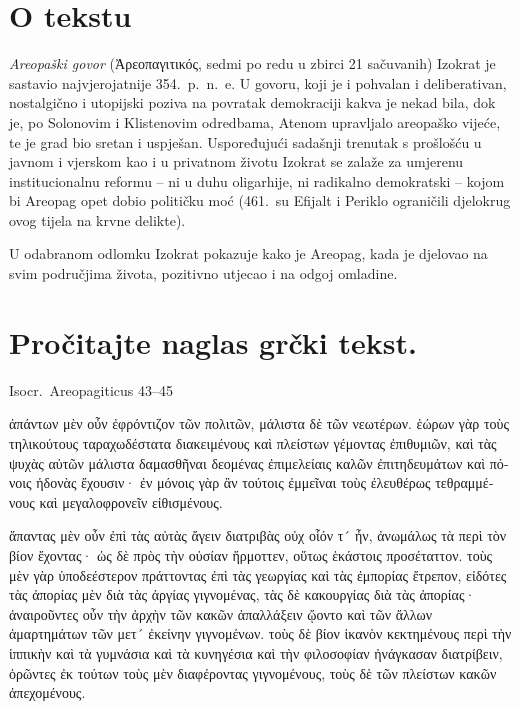 


\section*{O tekstu}

\textit{Areopaški govor} (Ἀρεοπαγιτικός, sedmi po redu u zbirci 21 sačuvanih) Izokrat je sastavio najvjerojatnije 354.\ p.~n.~e. U govoru, koji je i pohvalan i deliberativan, nostalgično i utopijski poziva na povratak demokraciji kakva je nekad bila, dok je, po Solonovim i Klistenovim odredbama, Atenom upravljalo areopaško vijeće, te je grad bio sretan i uspješan. Uspoređujući sadašnji trenutak s prošlošću u javnom i vjerskom kao i u privatnom životu Izokrat se zalaže za umjerenu institucionalnu reformu – ni u duhu oligarhije, ni radikalno demokratski – kojom bi Areopag opet dobio političku moć (461.\ su Efijalt i Periklo ograničili djelokrug ovog tijela na krvne delikte).

U odabranom odlomku Izokrat pokazuje kako je Areopag, kada je djelovao na svim područjima života, pozitivno utjecao i na odgoj omladine.


\section*{Pročitajte naglas grčki tekst.}

Isocr.\ Areopagiticus 43–45


\medskip


{\large

\begin{greek}

\noindent  ἁπάντων μὲν οὖν ἐφρόντιζον τῶν πολιτῶν, μάλιστα δὲ τῶν νεωτέρων. ἑώρων γὰρ τοὺς τηλικούτους ταραχωδέστατα διακειμένους καὶ πλείστων γέμοντας ἐπιθυμιῶν, καὶ τὰς ψυχὰς αὐτῶν μάλιστα δαμασθῆναι δεομένας ἐπιμελείαις καλῶν ἐπιτηδευμάτων καὶ πόνοις ἡδονὰς ἔχουσιν· ἐν μόνοις γὰρ ἂν τούτοις ἐμμεῖναι τοὺς ἐλευθέρως τεθραμμένους καὶ μεγαλοφρονεῖν εἰθισμένους.

\noindent  ἅπαντας μὲν οὖν ἐπὶ τὰς αὐτὰς ἄγειν διατριβὰς οὐχ οἷόν τ´ ἦν, ἀνωμάλως τὰ περὶ τὸν βίον ἔχοντας· ὡς δὲ πρὸς τὴν οὐσίαν ἥρμοττεν, οὕτως ἑκάστοις προσέταττον. τοὺς μὲν γὰρ ὑποδεέστερον πράττοντας ἐπὶ τὰς γεωργίας καὶ τὰς ἐμπορίας ἔτρεπον, εἰδότες τὰς ἀπορίας μὲν διὰ τὰς ἀργίας γιγνομένας, τὰς δὲ κακουργίας διὰ τὰς ἀπορίας· ἀναιροῦντες οὖν τὴν ἀρχὴν τῶν κακῶν ἀπαλλάξειν ᾤοντο καὶ τῶν ἄλλων ἁμαρτημάτων τῶν μετ´ ἐκείνην γιγνομένων. τοὺς δὲ βίον ἱκανὸν κεκτημένους περὶ τὴν ἱππικὴν καὶ τὰ γυμνάσια καὶ τὰ κυνηγέσια καὶ τὴν φιλοσοφίαν ἠνάγκασαν διατρίβειν, ὁρῶντες ἐκ τούτων τοὺς μὲν διαφέροντας γιγνομένους, τοὺς δὲ τῶν πλείστων κακῶν ἀπεχομένους.
\end{greek}

}

